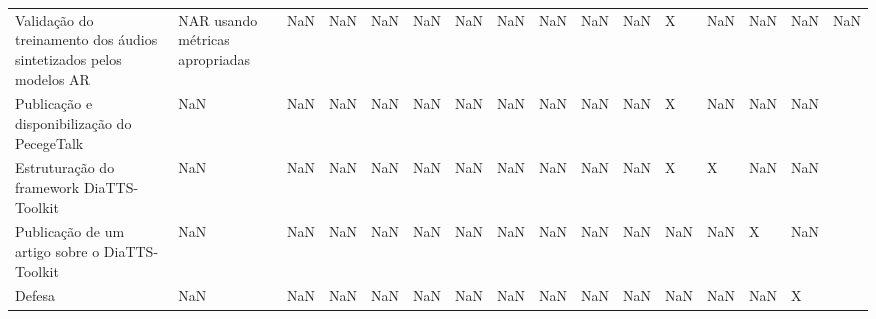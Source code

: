 \begin{tabular}{lllllllllllllll}
Validação do treinamento dos áudios sintetizados pelos modelos AR & NAR usando métricas apropriadas & NaN & NaN & NaN & NaN & NaN & NaN & NaN & NaN & NaN & X & NaN & NaN & NaN & NaN \\
Publicação e disponibilização do PecegeTalk & NaN & NaN & NaN & NaN & NaN & NaN & NaN & NaN & NaN & NaN & X & NaN & NaN & NaN \\
Estruturação do framework DiaTTS-Toolkit  & NaN & NaN & NaN & NaN & NaN & NaN & NaN & NaN & NaN & NaN & X & X & NaN & NaN \\
Publicação de um artigo sobre o DiaTTS-Toolkit  & NaN & NaN & NaN & NaN & NaN & NaN & NaN & NaN & NaN & NaN & NaN & NaN & X & NaN \\
Defesa & NaN & NaN & NaN & NaN & NaN & NaN & NaN & NaN & NaN & NaN & NaN & NaN & NaN & X \\
\bottomrule
\end{tabular}
